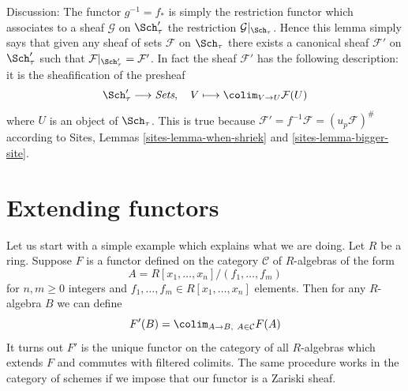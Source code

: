 Discussion:
The functor $g^{-1} = f_*$ is simply the restriction functor which associates
to a sheaf $\mathcal{G}$ on $\Sch'_\tau$ the restriction
$\mathcal{G}|_{\Sch_\tau}$. Hence this lemma simply says that given
any sheaf of sets $\mathcal{F}$ on $\Sch_\tau$ there exists a
canonical sheaf $\mathcal{F}'$ on $\Sch'_\tau$ such that
$\mathcal{F}|_{\Sch'_\tau} = \mathcal{F}'$. In fact the sheaf
$\mathcal{F}'$ has the following description: it is the sheafification
of the presheaf
$$
\Sch'_\tau \longrightarrow \textit{Sets}, \quad
V \longmapsto \colim_{V \to U} \mathcal{F}(U)
$$
where $U$ is an object of $\Sch_\tau$. This is true because
$\mathcal{F}' = f^{-1}\mathcal{F} = (u_p\mathcal{F})^\#$ according to
Sites, Lemmas \ref{sites-lemma-when-shriek} and \ref{sites-lemma-bigger-site}.

\section{Extending functors}
\label{topologies-section-extending-functors}
Let us start with a simple example which explains what we are doing.
Let $R$ be a ring. Suppose $F$ is a functor defined on the category
$\mathcal{C}$ of $R$-algebras of the form
$$
A = R[x_1, \ldots, x_n]/(f_1, \ldots, f_m)
$$
for $n, m \geq 0$ integers and $f_1, \ldots, f_m \in R[x_1, \ldots, x_n]$
elements. Then for any $R$-algebra $B$ we can define
$$
F'(B) = \colim_{A \to B,\ A \in \mathcal{C}} F(A)
$$
It turns out $F'$ is the unique functor on the category
of all $R$-algebras which extends $F$ and commutes with filtered
colimits. The same procedure works in the category of schemes
if we impose that our functor is a Zariski sheaf.


